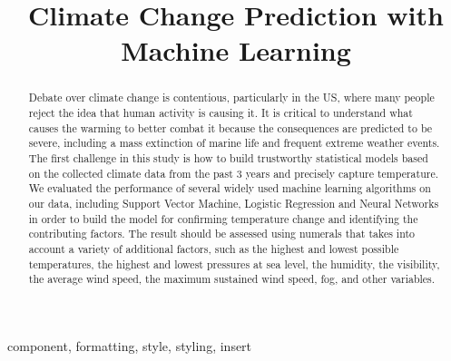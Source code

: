 \documentclass[conference]{IEEEtran}
\begin{document}
\title{Climate Change Prediction with Machine Learning\\
}

\author{
\and
{}
\and
{}
\and
{}
}

\maketitle

\begin{abstract}
Debate over climate change is contentious, particularly in the US, where many people reject the idea that human activity is causing it. It is critical to understand what causes the warming to better combat it because the consequences are predicted to be severe, including a mass extinction of marine life and frequent extreme weather events. The first challenge in this study is how to build trustworthy statistical models based on the collected climate data from the past 3 years and precisely capture temperature. We evaluated the performance of several widely used machine learning algorithms on our data, including Support Vector Machine, Logistic Regression and Neural Networks in order to build the model for confirming temperature change and identifying the contributing factors. The result should be assessed using numerals that takes into account a variety of additional factors, such as the highest and lowest possible temperatures, the highest and lowest pressures at sea level, the humidity, the visibility, the average wind speed, the maximum sustained wind speed, fog, and other variables.
\end{abstract}

\begin{IEEEkeywords}
component, formatting, style, styling, insert
\end{IEEEkeywords}
\end{document}
